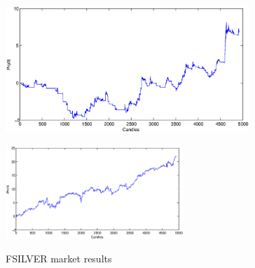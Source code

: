 \documentclass{tewiart}
\begin{document}
\begin{figure}[h]
\begin{minipage}{.49\linewidth}
\centering 
\includegraphics[width=0.82\textwidth]{images/S1d_silver.eps}
\label{mansard}
\end{minipage}
\begin{minipage}{\linewidth}
\centering 
\includegraphics[width=0.6\textwidth]{images/S1s_silver.eps}
\label{mansard}
\end{minipage}
\caption{FSILVER market results}
\end{figure}
\FloatBarrier
\end{document}
